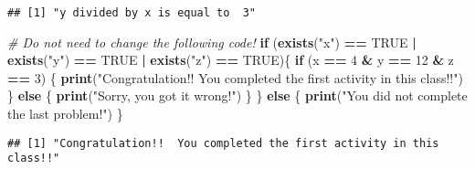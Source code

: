 \documentclass[
]{article}
\newenvironment{Shaded}{\begin{snugshade}}{\end{snugshade}}
\newcommand{\CommentTok}[1]{\textcolor[rgb]{0.56,0.35,0.01}{\textit{#1}}}
\newcommand{\ConstantTok}[1]{\textcolor[rgb]{0.56,0.35,0.01}{#1}}
\newcommand{\ControlFlowTok}[1]{\textcolor[rgb]{0.13,0.29,0.53}{\textbf{#1}}}
\newcommand{\DecValTok}[1]{\textcolor[rgb]{0.00,0.00,0.81}{#1}}
\newcommand{\FunctionTok}[1]{\textcolor[rgb]{0.13,0.29,0.53}{\textbf{#1}}}
\newcommand{\NormalTok}[1]{#1}
\newcommand{\SpecialCharTok}[1]{\textcolor[rgb]{0.81,0.36,0.00}{\textbf{#1}}}
\newcommand{\StringTok}[1]{\textcolor[rgb]{0.31,0.60,0.02}{#1}}
\begin{document}
\begin{verbatim}
## [1] "y divided by x is equal to  3"
\end{verbatim}

\begin{Shaded}
\begin{Highlighting}[]
\CommentTok{\# Do not need to change the following code!}
\ControlFlowTok{if}\NormalTok{ (}\FunctionTok{exists}\NormalTok{(}\StringTok{"x"}\NormalTok{) }\SpecialCharTok{==} \ConstantTok{TRUE} \SpecialCharTok{|} \FunctionTok{exists}\NormalTok{(}\StringTok{"y"}\NormalTok{) }\SpecialCharTok{==} \ConstantTok{TRUE} \SpecialCharTok{|} \FunctionTok{exists}\NormalTok{(}\StringTok{"z"}\NormalTok{) }\SpecialCharTok{==} \ConstantTok{TRUE}\NormalTok{)\{}
  \ControlFlowTok{if}\NormalTok{ (x }\SpecialCharTok{==} \DecValTok{4} \SpecialCharTok{\&}\NormalTok{ y }\SpecialCharTok{==} \DecValTok{12} \SpecialCharTok{\&}\NormalTok{ z }\SpecialCharTok{==} \DecValTok{3}\NormalTok{) \{}
  \FunctionTok{print}\NormalTok{(}\StringTok{"Congratulation!!  You completed the first activity in this class!!"}\NormalTok{)}
\NormalTok{  \} }\ControlFlowTok{else}\NormalTok{ \{}
    \FunctionTok{print}\NormalTok{(}\StringTok{"Sorry, you got it wrong!"}\NormalTok{)}
\NormalTok{  \}}
\NormalTok{\} }\ControlFlowTok{else}\NormalTok{ \{}
  \FunctionTok{print}\NormalTok{(}\StringTok{"You did not complete the last problem!"}\NormalTok{)}
\NormalTok{\}}
\end{Highlighting}
\end{Shaded}

\begin{verbatim}
## [1] "Congratulation!!  You completed the first activity in this class!!"
\end{verbatim}
\end{document}
